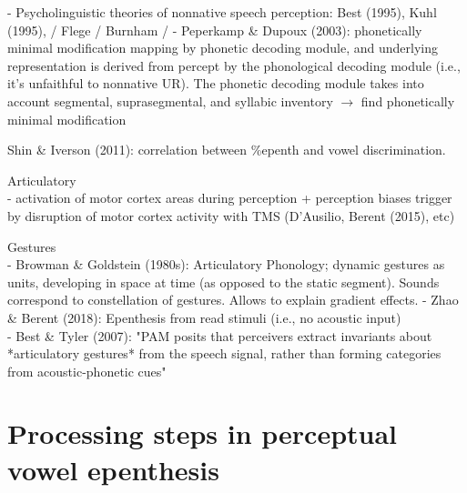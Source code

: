     - Psycholinguistic theories of nonnative speech perception: Best (1995), Kuhl (1995), / Flege / Burnham /  
    - Peperkamp \& Dupoux (2003): phonetically minimal modification mapping by phonetic decoding module, and underlying representation is derived from percept by the phonological decoding module (i.e., it's unfaithful to nonnative UR). The phonetic decoding module takes into account segmental, suprasegmental, and syllabic inventory $\rightarrow$ find phonetically minimal modification \\

  \item Shin \& Iverson (2011): correlation between \%epenth and vowel discrimination.   
  \item Articulatory \\
    - activation of motor cortex areas during perception + perception biases trigger by disruption of motor cortex activity with TMS (D'Ausilio, Berent (2015), etc)
  \item Gestures \\
    - Browman \& Goldstein (1980s): Articulatory Phonology; dynamic gestures as units, developing in space at time (as opposed to the static segment). Sounds correspond to constellation of gestures. Allows to explain gradient effects.  
    - Zhao \& Berent (2018): Epenthesis from read stimuli (i.e., no acoustic input) \\
    - Best \& Tyler (2007): "PAM posits that perceivers extract invariants about *articulatory gestures* from the speech signal, rather than forming categories from acoustic-phonetic cues"


\section{Processing steps in perceptual vowel epenthesis}

